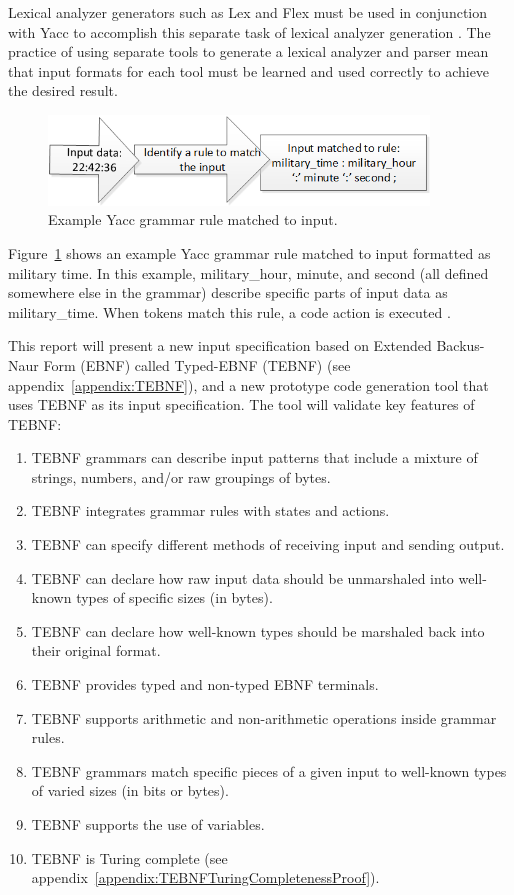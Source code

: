 \indent
Lexical analyzer generators such as Lex and Flex must be used in conjunction with Yacc to accomplish this separate task of lexical analyzer generation \cite{johnson_01,lesk_01}.  The practice of using separate tools to generate a lexical analyzer and parser mean that input formats for each tool must be learned and used correctly to achieve the desired result.

\begin{figure}[htbp]
\centering
\includegraphics[width=0.9\textwidth]{figures/YaccGrammarRule.png}
\caption{Example Yacc grammar rule matched to input.}
\label{fig:YaccGrammarRule}
\end{figure}

\indent
Figure~\ref{fig:YaccGrammarRule} shows an example Yacc grammar rule matched to input formatted as military time.  In this example, military\_hour, minute, and second (all defined somewhere else in the grammar) describe specific parts of input data as military\_time.  When tokens match this rule, a code action is executed \cite{johnson_01,niemann_01}.

\indent
This report will present a new input specification based on Extended Backus-Naur Form (EBNF) called Typed-EBNF (TEBNF) (see appendix~\ref{appendix:TEBNF}), and a new prototype code generation tool that uses TEBNF as its input specification.  The tool will validate key features of TEBNF:
\begin{enumerate}
  \item TEBNF grammars can describe input patterns that include a mixture of strings, numbers, and/or raw groupings of bytes.
  \item TEBNF integrates grammar rules with states and actions.
  \item TEBNF can specify different methods of receiving input and sending output.
  \item TEBNF can declare how raw input data should be unmarshaled into well-known types of specific sizes (in bytes).
  \item TEBNF can declare how well-known types should be marshaled back into their original format.
  \item TEBNF provides typed and non-typed EBNF terminals.
  \item TEBNF supports arithmetic and non-arithmetic operations inside grammar rules.
  \item TEBNF grammars match specific pieces of a given input to well-known types of varied sizes (in bits or bytes).
  \item TEBNF supports the use of variables.
  \item TEBNF is Turing complete (see appendix~\ref{appendix:TEBNFTuringCompletenessProof}).
\end{enumerate}

